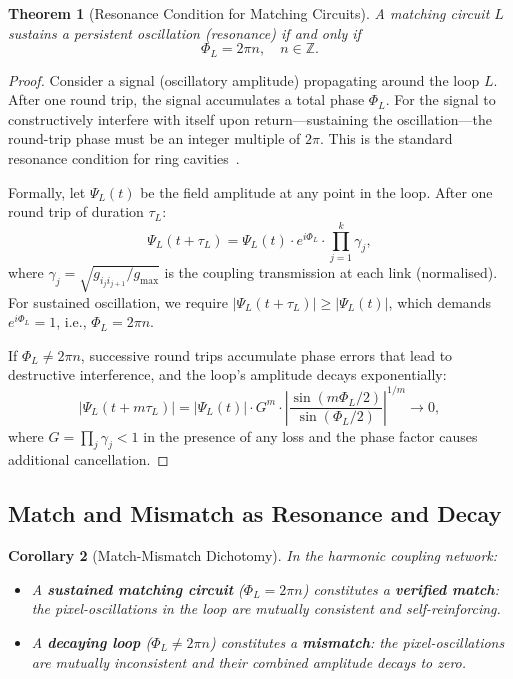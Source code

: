 \documentclass[11pt,twocolumn,a4paper]{article}
\newtheorem{theorem}{Theorem}[section]
\newtheorem{corollary}[theorem]{Corollary}
\newcommand{\Z}{\mathbb{Z}}
\begin{document}
\begin{theorem}[Resonance Condition for Matching Circuits]\label{thm:resonance}
A matching circuit $L$ sustains a persistent oscillation (resonance) if and only if
\begin{equation}
    \Phi_L = 2\pi n, \quad n \in \Z.
    \label{eq:resonance_condition}
\end{equation}
\end{theorem}

\begin{proof}
Consider a signal (oscillatory amplitude) propagating around the loop $L$. After one round trip, the signal accumulates a total phase $\Phi_L$. For the signal to constructively interfere with itself upon return---sustaining the oscillation---the round-trip phase must be an integer multiple of $2\pi$. This is the standard resonance condition for ring cavities~\citep{hecht2017, born1999}.

Formally, let $\Psi_L(t)$ be the field amplitude at any point in the loop. After one round trip of duration $\tau_L$:
\begin{equation}
    \Psi_L(t + \tau_L) = \Psi_L(t) \cdot e^{i\Phi_L} \cdot \prod_{j=1}^{k} \gamma_j,
\end{equation}
where $\gamma_j = \sqrt{g_{i_j i_{j+1}}/g_{\max}}$ is the coupling transmission at each link (normalised). For sustained oscillation, we require $|\Psi_L(t + \tau_L)| \geq |\Psi_L(t)|$, which demands $e^{i\Phi_L} = 1$, i.e., $\Phi_L = 2\pi n$.

If $\Phi_L \neq 2\pi n$, successive round trips accumulate phase errors that lead to destructive interference, and the loop's amplitude decays exponentially:
\begin{equation}
    |\Psi_L(t + m\tau_L)| = |\Psi_L(t)| \cdot G^m \cdot \left|\frac{\sin(m\Phi_L/2)}{\sin(\Phi_L/2)}\right|^{1/m} \to 0,
\end{equation}
where $G = \prod_j \gamma_j < 1$ in the presence of any loss and the phase factor causes additional cancellation.
\end{proof}

\subsection{Match and Mismatch as Resonance and Decay}

\begin{corollary}[Match-Mismatch Dichotomy]\label{cor:match_mismatch}
In the harmonic coupling network:
\begin{itemize}[leftmargin=2em]
    \item A \textbf{sustained matching circuit} ($\Phi_L = 2\pi n$) constitutes a \textbf{verified match}: the pixel-oscillations in the loop are mutually consistent and self-reinforcing.
    \item A \textbf{decaying loop} ($\Phi_L \neq 2\pi n$) constitutes a \textbf{mismatch}: the pixel-oscillations are mutually inconsistent and their combined amplitude decays to zero.
\end{itemize}
\end{corollary}
\end{document}
